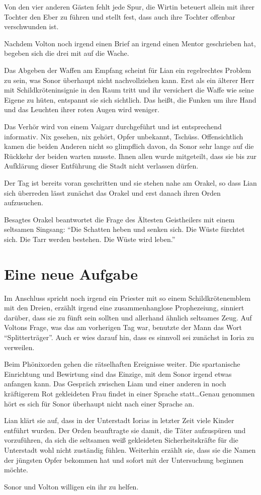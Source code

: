 Von den vier anderen Gästen fehlt jede Spur, die Wirtin beteuert allein mit ihrer Tochter den Eber zu führen und stellt fest, dass auch ihre Tochter offenbar verschwunden ist.

Nachdem Volton noch irgend einen Brief an irgend einen Mentor geschrieben hat, begeben sich die drei mit auf die Wache.

Das Abgeben der Waffen am Empfang scheint für Lian ein regelrechtes Problem zu sein, was Sonor überhaupt nicht nachvollziehen kann. Erst als ein älterer Herr mit Schildkröteninsignie in den Raum tritt und ihr versichert die Waffe wie seine Eigene zu hüten, entspannt sie sich sichtlich. Das heißt, die Funken um ihre Hand und das Leuchten ihrer roten Augen wird weniger.

Das Verhör wird von einem Vaigarr durchgeführt und ist entsprechend informativ. Nix gesehen, nix gehört, Opfer unbekannt, Tschüss.
Offensichtlich kamen die beiden Anderen nicht so glimpflich davon, da Sonor sehr lange auf die Rückkehr der beiden warten musste.
Ihnen allen wurde mitgeteilt, dass sie bis zur Aufklärung dieser Entführung die Stadt nicht verlassen dürfen.

Der Tag ist bereits voran geschritten und sie stehen nahe am Orakel, so dass Lian sich überreden lässt zunächst das Orakel und erst danach ihren Orden aufzusuchen.

Besagtes Orakel beantwortet die Frage des Ältesten Geistheilers mit einem seltsamen Singsang:
\enquote{Die Schatten heben und senken sich. Die Wüste fürchtet sich. Die Tarr werden bestehen. Die Wüste wird leben.}


\section{Eine neue Aufgabe}

Im Anschluss spricht noch irgend ein Priester mit so einem Schildkrötenemblem mit den Dreien, erzählt irgend eine zusammenhanglose Prophezeiung, sinniert darüber, dass sie zu fünft sein sollten und allerhand ähnlich seltsames Zeug.
Auf Voltons Frage, was das am vorherigen Tag war, benutzte der Mann das Wort \enquote{Splitterträger}. 
Auch er wies darauf hin, dass es sinnvoll sei zunächst in Ioria zu verweilen.

Beim Phönixorden gehen die rätselhaften Ereignisse weiter. Die spartanische Einrichtung und Bewirtung sind das Einzige, mit dem Sonor irgend etwas anfangen kann. Das Gespräch zwischen Liam und einer anderen in noch kräftigerem Rot gekleideten Frau findet in einer Sprache statt\ldots Genau genommen hört es sich für Sonor überhaupt nicht nach einer Sprache an.

Lian klärt sie auf, dass in der Unterstadt Iorias in letzter Zeit viele Kinder entführt wurden. Der Orden beauftragte sie damit, die Täter aufzuspüren und vorzuführen, da sich die seltsamen weiß gekleideten Sicherheitskräfte für die Unterstadt wohl nicht zuständig fühlen.
Weiterhin erzählt sie, dass sie die Namen der jüngsten Opfer bekommen hat und sofort mit der Untersuchung beginnen möchte.

Sonor und Volton willigen ein ihr zu helfen.